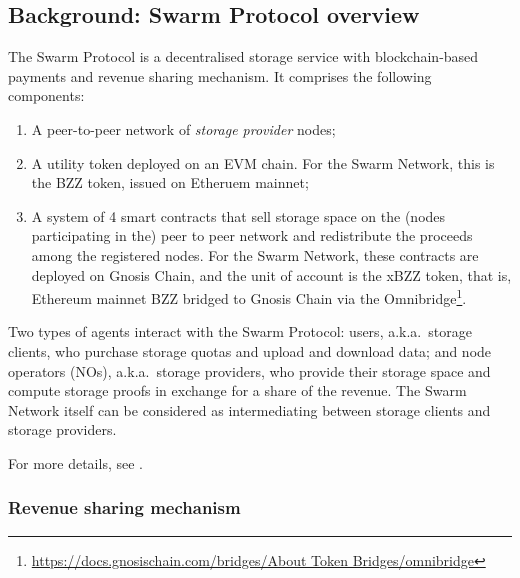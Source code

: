 \subsection{Background: Swarm Protocol overview}
\label{section:overview}

The Swarm Protocol is a decentralised storage service with blockchain-based payments and revenue sharing mechanism.
%
It comprises the following components:
%
\begin{enumerate}
  \item 
    A peer-to-peer network of \emph{storage provider} nodes;
  \item 
    A utility token deployed on an EVM chain. For the Swarm Network, this is the BZZ token, issued on Etheruem mainnet;
  \item 
    A system of 4 smart contracts that sell storage space on the (nodes participating in the) peer to peer network and redistribute the proceeds among the registered nodes.
    For the Swarm Network, these contracts are deployed on Gnosis Chain, and the unit of account is the xBZZ token, that is, Ethereum mainnet BZZ bridged to Gnosis Chain via the Omnibridge\footnote{\url{https://docs.gnosischain.com/bridges/About Token Bridges/omnibridge}}.
\end{enumerate}
%
Two types of agents interact with the Swarm Protocol: users, a.k.a.~storage clients, who purchase storage quotas and upload and download data; and node operators (NOs), a.k.a.~storage providers, who provide their storage space and compute storage proofs in exchange for a share of the revenue.
%
The Swarm Network itself can be considered as intermediating between storage clients and storage providers.

For more details, see \cite{book-of-swarm}.

\subsubsection{Revenue sharing mechanism}


